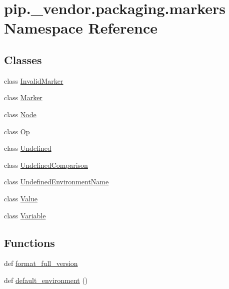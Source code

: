 \hypertarget{namespacepip_1_1__vendor_1_1packaging_1_1markers}{}\section{pip.\+\_\+vendor.\+packaging.\+markers Namespace Reference}
\label{namespacepip_1_1__vendor_1_1packaging_1_1markers}
\subsection*{Classes}
\begin{DoxyCompactItemize}
\item 
class \hyperlink{classpip_1_1__vendor_1_1packaging_1_1markers_1_1InvalidMarker}{Invalid\+Marker}
\item 
class \hyperlink{classpip_1_1__vendor_1_1packaging_1_1markers_1_1Marker}{Marker}
\item 
class \hyperlink{classpip_1_1__vendor_1_1packaging_1_1markers_1_1Node}{Node}
\item 
class \hyperlink{classpip_1_1__vendor_1_1packaging_1_1markers_1_1Op}{Op}
\item 
class \hyperlink{classpip_1_1__vendor_1_1packaging_1_1markers_1_1Undefined}{Undefined}
\item 
class \hyperlink{classpip_1_1__vendor_1_1packaging_1_1markers_1_1UndefinedComparison}{Undefined\+Comparison}
\item 
class \hyperlink{classpip_1_1__vendor_1_1packaging_1_1markers_1_1UndefinedEnvironmentName}{Undefined\+Environment\+Name}
\item 
class \hyperlink{classpip_1_1__vendor_1_1packaging_1_1markers_1_1Value}{Value}
\item 
class \hyperlink{classpip_1_1__vendor_1_1packaging_1_1markers_1_1Variable}{Variable}
\end{DoxyCompactItemize}
\subsection*{Functions}
\begin{DoxyCompactItemize}
\item 
def \hyperlink{namespacepip_1_1__vendor_1_1packaging_1_1markers_abe0a324e4fac3dae01d5ebb14c598f63}{format\+\_\+full\+\_\+version}
\item 
def \hyperlink{namespacepip_1_1__vendor_1_1packaging_1_1markers_ae5ac8c6aa42fcdea585f941135aa3c01}{default\+\_\+environment} ()
\end{DoxyCompactItemize}
